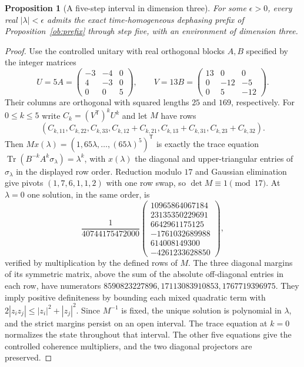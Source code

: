 \documentclass[aps,pra,onecolumn,superscriptaddress,nofootinbib,10pt]{revtex4-2}
\newtheorem{proposition}[theorem]{Proposition}
\theoremstyle{definition}
\theoremstyle{remark}
\newcommand{\tr}{\operatorname{Tr}}
\begin{document}
\begin{proposition}[A five-step interval in dimension three]
\label{ob:fivestepprefix}
For some \(\epsilon>0\), every real \(|\lambda|<\epsilon\) admits
the exact time-homogeneous dephasing prefix of
Proposition~\ref{ob:prefix} through step five, with an environment of
dimension three.
\end{proposition}
\begin{proof}
Use the controlled unitary with real orthogonal blocks \(A,B\)
specified by the integer matrices
\[
 U=5A=\begin{pmatrix}-3&-4&0\\4&-3&0\\0&0&5\end{pmatrix},
 \qquad
 V=13B=\begin{pmatrix}13&0&0\\0&-12&-5\\0&5&-12\end{pmatrix}.
\]
Their columns are orthogonal with squared lengths \(25\) and \(169\),
respectively. For \(0\le k\le5\) write \(C_k=(V^{\mathsf T})^k U^k\)
and let \(M\) have rows
\[
 (C_{k,11},C_{k,22},C_{k,33},C_{k,12}+C_{k,21},
   C_{k,13}+C_{k,31},C_{k,23}+C_{k,32}).
\]
Then \(Mx(\lambda)=(1,65\lambda,\ldots,(65\lambda)^5)^{\mathsf T}\)
is exactly the trace equation
\(\tr(B^{-k}A^k\sigma_\lambda)=\lambda^k\), with
\(x(\lambda)\) the diagonal and upper-triangular entries of
\(\sigma_\lambda\) in the displayed row order. Reduction modulo
\(17\) and Gaussian elimination give pivots \((1,7,6,1,1,2)\)
with one row swap, so \(\det M\equiv1\pmod {17}\).
At \(\lambda=0\) one solution, in the same order, is
\[
 \frac1{40744175472000}
 \begin{pmatrix}
 10965864067184\\23135350229691\\6642961175125\\
 -1761032689988\\614008149300\\-4261233628850
 \end{pmatrix},
\]
verified by multiplication by the defined rows of \(M\).
The three diagonal margins of its symmetric matrix, above the sum of
the absolute off-diagonal entries in each row, have numerators
\(8590823227896,17113083910853,1767719396975\).
They imply positive definiteness by bounding each mixed
quadratic term with \(2|z_iz_j|\le|z_i|^2+|z_j|^2\).
Since \(M^{-1}\) is fixed, the unique solution is polynomial in
\(\lambda\), and the strict margins persist on an open interval.
The trace equation at \(k=0\) normalizes the state throughout that
interval. The other five equations give the controlled coherence
multipliers, and the two diagonal projectors are preserved.
\end{proof}
\end{document}
